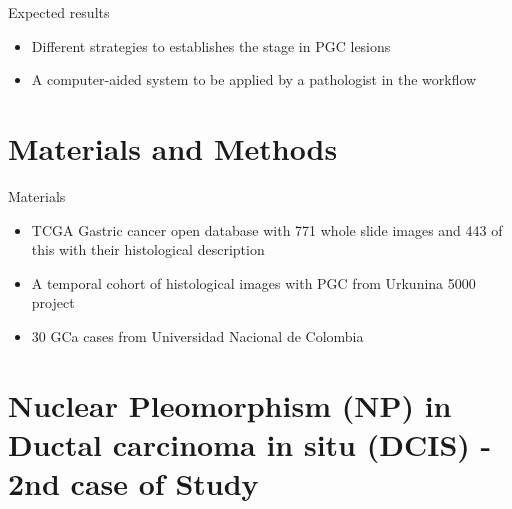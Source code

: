 \documentclass[usenames,dvipsnames]{beamer}
\begin{document}
\begin{frame}{Expected results}
\begin{itemize}
\item Different strategies to establishes the stage in PGC lesions
\item A computer-aided system to be applied by a pathologist in the workflow
\end{itemize}
\end{frame}

\section{Materials and Methods}
\begin{frame}{Materials}
\begin{itemize}
\item  TCGA Gastric cancer open database with 771 whole slide images and 443 of this with their histological description
\item A temporal cohort of histological images with PGC from Urkunina 5000 project
\item 30 GCa cases from Universidad Nacional de Colombia
\end{itemize}

\end{frame}
%
%


\section{Nuclear Pleomorphism (NP) in Ductal carcinoma in situ (DCIS) - 2nd case of Study}

\end{document}
